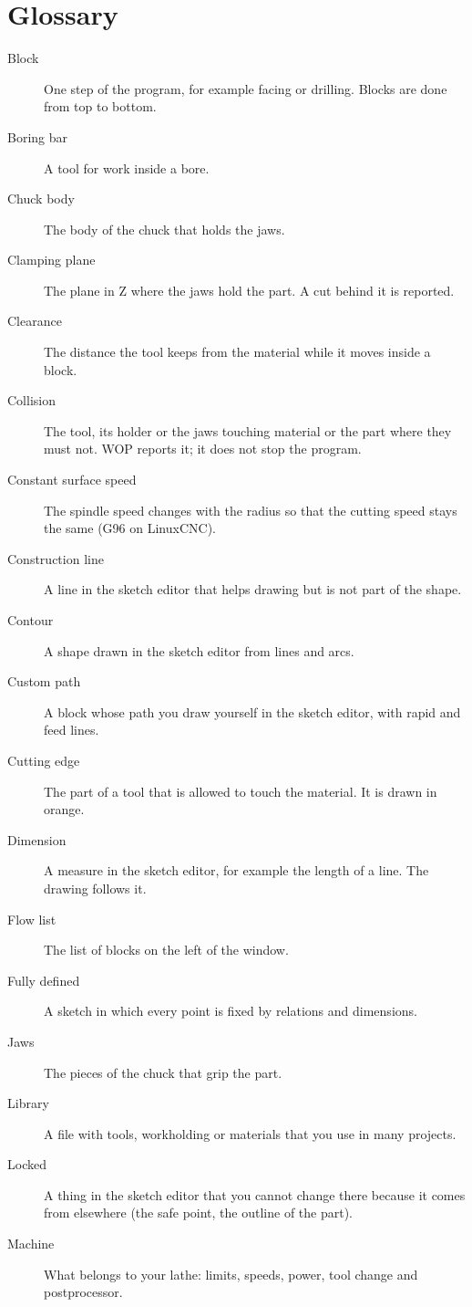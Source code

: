 \chapter{Glossary}\label{ch:glossary}

\begin{description}
\item[Block] One step of the program, for example facing or drilling. Blocks are done from top to bottom.
\item[Boring bar] A tool for work inside a bore.
\item[Chuck body] The body of the chuck that holds the jaws.
\item[Clamping plane] The plane in Z where the jaws hold the part. A cut behind it is reported.
\item[Clearance] The distance the tool keeps from the material while it moves inside a block.
\item[Collision] The tool, its holder or the jaws touching material or the part where they must not. WOP reports it; it does not stop the program.
\item[Constant surface speed] The spindle speed changes with the radius so that the cutting speed stays the same (G96 on LinuxCNC).
\item[Construction line] A line in the sketch editor that helps drawing but is not part of the shape.
\item[Contour] A shape drawn in the sketch editor from lines and arcs.
\item[Custom path] A block whose path you draw yourself in the sketch editor, with rapid and feed lines.
\item[Cutting edge] The part of a tool that is allowed to touch the material. It is drawn in orange.
\item[Dimension] A measure in the sketch editor, for example the length of a line. The drawing follows it.
\item[Flow list] The list of blocks on the left of the window.
\item[Fully defined] A sketch in which every point is fixed by relations and dimensions.
\item[Jaws] The pieces of the chuck that grip the part.
\item[Library] A file with tools, workholding or materials that you use in many projects.
\item[Locked] A thing in the sketch editor that you cannot change there because it comes from elsewhere (the safe point, the outline of the part).
\item[Machine] What belongs to your lathe: limits, speeds, power, tool change and postprocessor.

\end{description}
